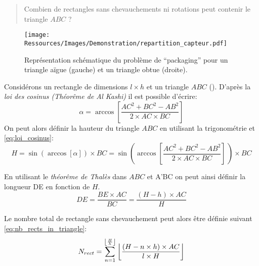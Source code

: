 

\blockquote{Combien de rectangles sans chevauchements ni rotations peut contenir le triangle $ABC$ ?}

\begin{figure}
    \centering
    \texttt{[image: Ressources/Images/Demonstration/repartition\_capteur.pdf]}
    \caption[Représentation schématique du problème de \enquote{packaging}]
            {Représentation schématique du problème de \enquote{packaging} pour
             un triangle aïgue (gauche) et un triangle obtue (droite).
             \label{fig:rects_in_triangle}}
\end{figure}

Considérons un rectangle de dimensions $l \times h$ et un triangle $ABC$ ().
D’après la \textit{loi des cosinus (Théorême de Al Kashi)} il est possible d’écrire:
\begin{equation}
        \alpha = \arccos \left[\frac{AC^{2} + BC^{2} - AB^{2}}{2 \times AC \times BC}\right]
    \label{eq:loi_cosinus}
\end{equation}
\noindent On peut alors définir la hauteur du triangle $ABC$ en utilisant la trigonométrie et
\eqref{eq:loi_cosinus}:
\begin{equation}
        H = \sin (\arccos[\alpha]) \times BC%
          =\sin \left(\arccos \left[\frac{AC^{2} + BC^{2} - AB^{2}}{2 \times AC \times BC}\right]\,\right) \times BC
    \label{fig:height_triangle}
\end{equation}

\noindent En utilisant le \textit{théorême de Thalès} dans $ABC$ et A’BC on peut ainsi définir la longueur DE
en fonction de $H$.
\begin{equation}
    DE = \frac{BE \times AC}{BC} = \frac{(H - h) \times AC}{H}
\end{equation}

\noindent Le nombre total de rectangle sans chevauchement peut alors être définie suivant \eqref{eq:nb_rects_in_triangle}:
\begin{equation}
    N_{rect} = \sum_{n = 1}^{\floor*{\frac{H}{h}}} \, \floor*{\frac{(H - n \times h) \times AC}{l \times H}}
    \label{eq:nb_rects_in_triangle}
\end{equation}
